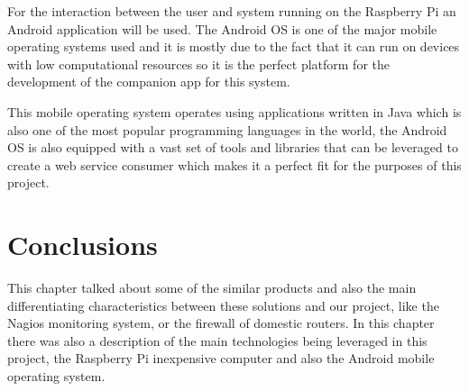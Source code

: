 For the interaction between the user and system running on the Raspberry Pi an
Android application will be used. The Android OS is one of the major mobile
operating systems used and it is mostly due to the fact that it can run on
devices with low computational resources so it is the perfect platform for the
development of the companion app for this system.

This mobile operating system operates using applications written in Java which
is also one of the most popular programming languages in the world, the Android
OS is also equipped with a vast set of tools and libraries that can be leveraged
to create a web service consumer which makes it a perfect fit for the purposes
of this project.


\section{Conclusions}
\label{chap2:sec:concs}
This chapter talked about some of the similar products and also the main
differentiating characteristics between these solutions and our project, like
the Nagios monitoring system, or the firewall of domestic routers.
In this chapter there was also a description of the main technologies being
leveraged in this project, the Raspberry Pi inexpensive computer and also the
Android mobile operating system.
